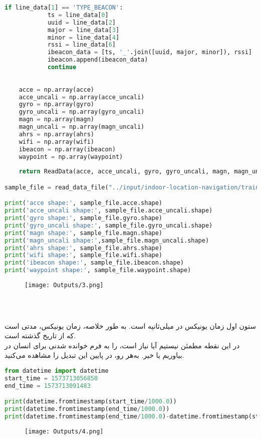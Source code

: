 \documentclass{article}
\begin{document}
\begin{latin}
\begin{lstlisting}[language=Python]
		if line_data[1] == 'TYPE_BEACON':
			ts = line_data[0]
			uuid = line_data[2]
			major = line_data[3]
			minor = line_data[4]
			rssi = line_data[6]
			ibeacon_data = [ts, '_'.join([uuid, major, minor]), rssi]
			ibeacon.append(ibeacon_data)
			continue
	
	
	acce = np.array(acce)
	acce_uncali = np.array(acce_uncali)
	gyro = np.array(gyro)
	gyro_uncali = np.array(gyro_uncali)
	magn = np.array(magn)
	magn_uncali = np.array(magn_uncali)
	ahrs = np.array(ahrs)
	wifi = np.array(wifi)
	ibeacon = np.array(ibeacon)
	waypoint = np.array(waypoint)
	
	return ReadData(acce, acce_uncali, gyro, gyro_uncali, magn, magn_uncali, ahrs, wifi, ibeacon, waypoint)

sample_file = read_data_file("../input/indoor-location-navigation/train/5a0546857ecc773753327266/F2/5dccf516c04f060006e6e3c9.txt")

print('acce shape:', sample_file.acce.shape)
print('acce_uncali shape:', sample_file.acce_uncali.shape)
print('gyro shape:', sample_file.gyro.shape)
print('gyro_uncali shape:', sample_file.gyro_uncali.shape)
print('magn shape:', sample_file.magn.shape)
print('magn_uncali shape:',sample_file.magn_uncali.shape)
print('ahrs shape:', sample_file.ahrs.shape)
print('wifi shape:', sample_file.wifi.shape)
print('ibeacon shape:', sample_file.ibeacon.shape)
print('waypoint shape:', sample_file.waypoint.shape)
\end{lstlisting}
\end{latin}
\begin{figure}[hbt!]
	\centering
	\texttt{[image: Outputs/3.png]}
\end{figure}
\ \\
\subsection*{}
ستون اول زمان یونیکس در میلی‌ثانیه است. به طور خلاصه، زمان یونیکس، مدتی است که از تاریخ  گذشته است.\\
در این نقطه مطمئن نیستیم آیا نیاز است،  را به فرم خوانده شدنی برای انسان در بیاوریم یا خیر. به‌هر رو، در پایین این تبدیل را مشاهده می‌کنید.
\begin{latin}
\begin{lstlisting}[language=Python]
from datetime import datetime
start_time = 1573713056850
end_time = 1573713091483

print(datetime.fromtimestamp(start_time/1000.0))
print(datetime.fromtimestamp(end_time/1000.0))
print(datetime.fromtimestamp(end_time/1000.0)-datetime.fromtimestamp(start_time/1000.0))
\end{lstlisting}
\end{latin}
\begin{figure}[hbt!]
	\centering
	\texttt{[image: Outputs/4.png]}
\end{figure}
\ \\
\end{document}

